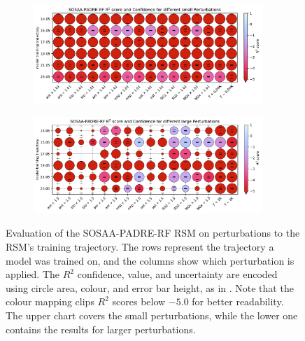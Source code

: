 \vspace{-1em}

\begin{figure}[H]
    \centering
    \begin{subfigure}
        \centering
        \includegraphics[width=0.95\textwidth]{evaluation/figures/results/perturbation-generalisation-padre-rf-small.pdf}
    \end{subfigure}

    \begin{subfigure}
        \centering
        \includegraphics[width=0.95\textwidth]{evaluation/figures/results/perturbation-generalisation-padre-rf-large.pdf}
    \end{subfigure}

    \vspace{-1em}
    \caption[Evaluation of the SOSAA-PADRE-RF RSM on Perturbations]{Evaluation of the SOSAA-PADRE-RF RSM on perturbations to the RSM's training trajectory. The rows represent the trajectory a model was trained on, and the columns show which perturbation is applied. The $R^2$ confidence, value, and uncertainty are encoded using circle area, colour, and error bar height, as in . Note that the colour mapping clips $R^2$ scores below $-5.0$ for better readability. The upper chart covers the small perturbations, while the lower one contains the results for larger perturbations.}
    \label{fig:sosaa-rsm-perturbations-padre-rf}
\end{figure}

